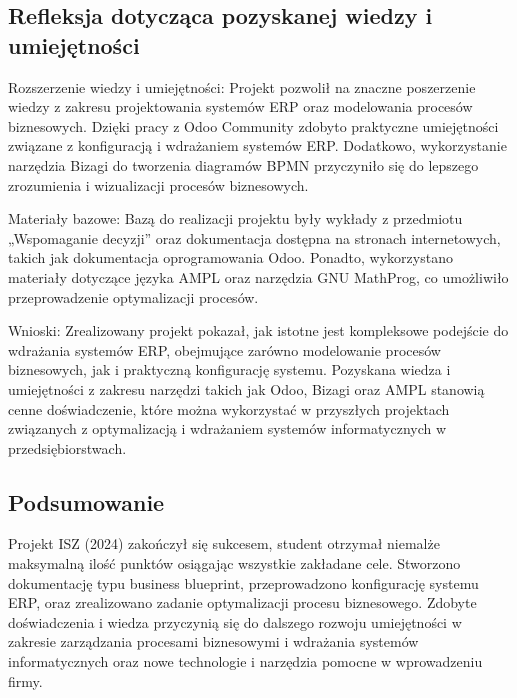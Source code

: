 \subsection{Refleksja dotycząca pozyskanej wiedzy i umiejętności}

Rozszerzenie wiedzy i umiejętności:
Projekt pozwolił na znaczne poszerzenie wiedzy z zakresu projektowania systemów ERP oraz modelowania procesów biznesowych. Dzięki pracy z Odoo Community\cite{odoo} zdobyto praktyczne umiejętności związane z konfiguracją i wdrażaniem systemów ERP. Dodatkowo, wykorzystanie narzędzia Bizagi do tworzenia diagramów BPMN przyczyniło się do lepszego zrozumienia i wizualizacji procesów biznesowych.

Materiały bazowe:
Bazą do realizacji projektu były wykłady z przedmiotu „Wspomaganie decyzji” oraz dokumentacja dostępna na stronach internetowych, takich jak dokumentacja oprogramowania Odoo. Ponadto, wykorzystano materiały dotyczące języka AMPL oraz narzędzia GNU MathProg, co umożliwiło przeprowadzenie optymalizacji procesów.

Wnioski:
Zrealizowany projekt pokazał, jak istotne jest kompleksowe podejście do wdrażania systemów ERP, obejmujące zarówno modelowanie procesów biznesowych, jak i praktyczną konfigurację systemu. Pozyskana wiedza i umiejętności z zakresu narzędzi takich jak Odoo, Bizagi oraz AMPL stanowią cenne doświadczenie, które można wykorzystać w przyszłych projektach związanych z optymalizacją i wdrażaniem systemów informatycznych w przedsiębiorstwach.

\subsection{Podsumowanie}

Projekt ISZ (2024) zakończył się sukcesem, student otrzymał niemalże maksymalną ilość punktów osiągając wszystkie zakładane cele.
 Stworzono dokumentację typu business blueprint, przeprowadzono konfigurację systemu ERP, oraz zrealizowano zadanie optymalizacji procesu biznesowego.
  Zdobyte doświadczenia i wiedza przyczynią się do dalszego rozwoju umiejętności w zakresie zarządzania procesami biznesowymi i wdrażania systemów informatycznych oraz nowe technologie i narzędzia pomocne w wprowadzeniu firmy.

